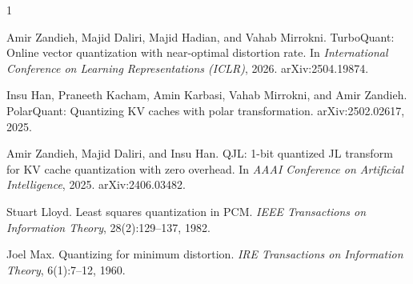 \documentclass{article}
\begin{document}
\begin{thebibliography}{1}

Amir Zandieh, Majid Daliri, Majid Hadian, and Vahab Mirrokni.
\newblock TurboQuant: Online vector quantization with near-optimal distortion rate.
\newblock In \emph{International Conference on Learning Representations
  (ICLR)}, 2026. arXiv:2504.19874.

Insu Han, Praneeth Kacham, Amin Karbasi, Vahab Mirrokni, and Amir Zandieh.
\newblock PolarQuant: Quantizing KV caches with polar transformation.
\newblock arXiv:2502.02617, 2025.

Amir Zandieh, Majid Daliri, and Insu Han.
\newblock QJL: 1-bit quantized JL transform for KV cache quantization with zero
  overhead.
\newblock In \emph{AAAI Conference on Artificial Intelligence}, 2025.
  arXiv:2406.03482.

Stuart Lloyd.
\newblock Least squares quantization in PCM.
\newblock \emph{IEEE Transactions on Information Theory},
  28(2):129--137, 1982.

Joel Max.
\newblock Quantizing for minimum distortion.
\newblock \emph{IRE Transactions on Information Theory},
  6(1):7--12, 1960.

\end{thebibliography}
\end{document}
